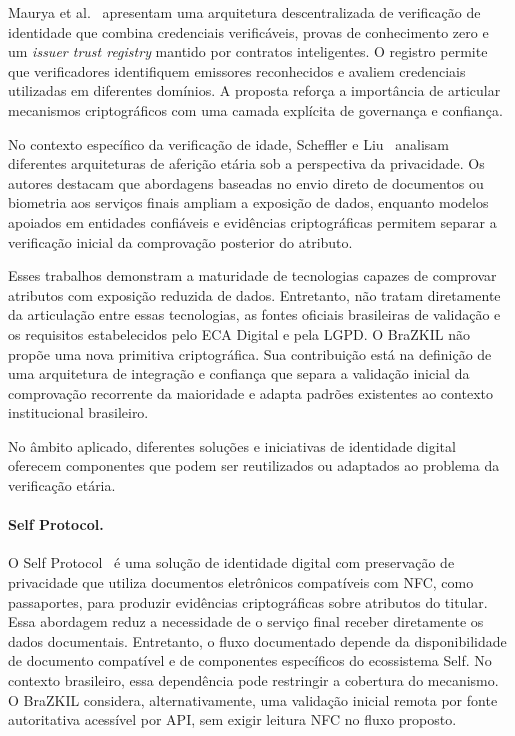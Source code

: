 \documentclass[12pt]{article}
\begin{document}
Maurya et al.~\cite{maurya2025} apresentam uma arquitetura descentralizada de verificação de identidade que combina credenciais verificáveis, provas de conhecimento zero e um \textit{issuer trust registry} mantido por contratos inteligentes. O registro permite que verificadores identifiquem emissores reconhecidos e avaliem credenciais utilizadas em diferentes domínios. A proposta reforça a importância de articular mecanismos criptográficos com uma camada explícita de governança e confiança.

No contexto específico da verificação de idade, Scheffler e Liu~\cite{scheffler2025} analisam diferentes arquiteturas de aferição etária sob a perspectiva da privacidade. Os autores destacam que abordagens baseadas no envio direto de documentos ou biometria aos serviços finais ampliam a exposição de dados, enquanto modelos apoiados em entidades confiáveis e evidências criptográficas permitem separar a verificação inicial da comprovação posterior do atributo.

Esses trabalhos demonstram a maturidade de tecnologias capazes de comprovar atributos com exposição reduzida de dados. Entretanto, não tratam diretamente da articulação entre essas tecnologias, as fontes oficiais brasileiras de validação e os requisitos estabelecidos pelo ECA Digital e pela LGPD. O BraZKIL não propõe uma nova primitiva criptográfica. Sua contribuição está na definição de uma arquitetura de integração e confiança que separa a validação inicial da comprovação recorrente da maioridade e adapta padrões existentes ao contexto institucional brasileiro.

No âmbito aplicado, diferentes soluções e iniciativas de identidade digital oferecem componentes que podem ser reutilizados ou adaptados ao problema da verificação etária.

\paragraph{Self Protocol.}
O Self Protocol~\cite{selflabs2024} é uma solução de identidade digital com preservação de privacidade que utiliza documentos eletrônicos compatíveis com NFC, como passaportes, para produzir evidências criptográficas sobre atributos do titular. Essa abordagem reduz a necessidade de o serviço final receber diretamente os dados documentais. Entretanto, o fluxo documentado depende da disponibilidade de documento compatível e de componentes específicos do ecossistema Self. No contexto brasileiro, essa dependência pode restringir a cobertura do mecanismo. O BraZKIL considera, alternativamente, uma validação inicial remota por fonte autoritativa acessível por API, sem exigir leitura NFC no fluxo proposto.
\end{document}
